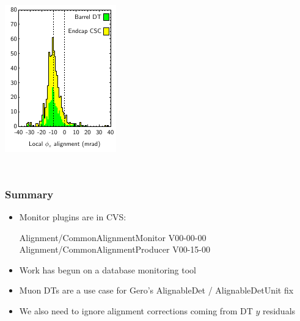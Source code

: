 \documentclass[compress]{beamer}
\begin{document}
\begin{frame}
\begin{columns}
\includegraphics[width=\linewidth]{phiz_alignments_phiz}
\end{columns}
\end{frame}

\section*{}

\begin{frame}
\frametitle{Summary}
\begin{itemize}\setlength{\itemsep}{0.75 cm}
\item Monitor plugins are in CVS:

Alignment/CommonAlignmentMonitor V00-00-00 \\
Alignment/CommonAlignmentProducer V00-15-00

\item Work has begun on a database monitoring tool

\item Muon DTs are a use case for Gero's AlignableDet / AlignableDetUnit fix

\item We also need to ignore alignment corrections coming from DT $y$ residuals

\end{itemize}
\label{numpages}
\end{frame}
\end{document}
